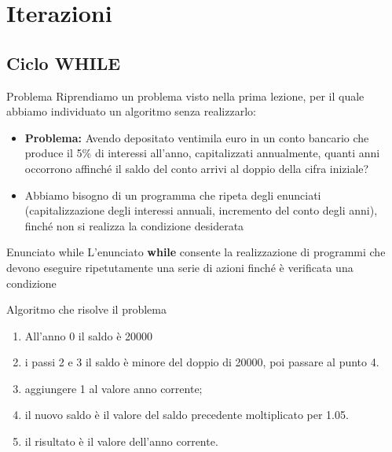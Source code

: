 \section*{Iterazioni}
\subsection*{Ciclo WHILE}
\begin{frame}
\begin{block}{Problema}
Riprendiamo un problema visto nella prima lezione, per il quale abbiamo individuato un algoritmo senza realizzarlo:
\begin{itemize}
\item \textbf{Problema:} Avendo depositato ventimila euro in un conto bancario che produce il 5\% di interessi all'anno, capitalizzati 
annualmente, quanti anni occorrono affinché il saldo del conto arrivi al doppio della cifra iniziale?
\item Abbiamo bisogno di un programma che ripeta degli enunciati (capitalizzazione degli interessi annuali, incremento del conto degli 
anni), finché non si realizza la condizione desiderata
\end{itemize}	
\end{block}
\end{frame}

\begin{frame}
\begin{block}{Enunciato while}
L'enunciato \textbf{while} consente la realizzazione di programmi che devono eseguire ripetutamente una serie di azioni finché è 
verificata una condizione
\end{block}
\begin{block}{Algoritmo che risolve il problema}
\begin{enumerate}
\item All'anno 0 il saldo è 20000
\item \textbf{} i passi 2 e 3 \textbf{} il saldo è minore del doppio di 20000, poi passare al punto 4.
\item aggiungere 1 al valore anno corrente;
\item il nuovo saldo è il valore del saldo precedente moltiplicato per 1.05.
\item il risultato è il valore dell'anno corrente.
\end{enumerate}
\end{block}
\end{frame}

